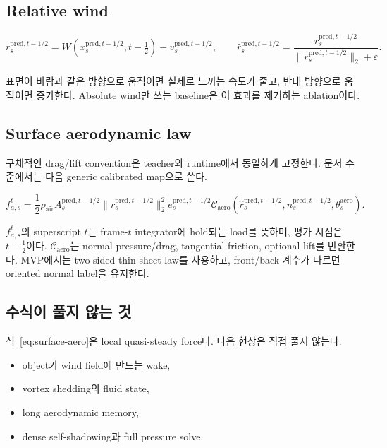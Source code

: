 \documentclass[11pt,a4paper]{article}
\newcommand{\eps}{\varepsilon}
\begin{document}
\subsection*{Relative wind}

\begin{equation}
  r_s^{\mathrm{pred},t-1/2}
  =
  W(x_s^{\mathrm{pred},t-1/2},t-\tfrac12)
  -v_s^{\mathrm{pred},t-1/2},
  \qquad
  \widehat r_s^{\mathrm{pred},t-1/2}
  =
  \frac{r_s^{\mathrm{pred},t-1/2}}
  {\|r_s^{\mathrm{pred},t-1/2}\|_2+\eps}.
  \label{eq:relative-wind}
\end{equation}

표면이 바람과 같은 방향으로 움직이면 실제로 느끼는 속도가 줄고,
반대 방향으로 움직이면 증가한다.
Absolute wind만 쓰는 baseline은 이 효과를 제거하는 ablation이다.

\subsection*{Surface aerodynamic law}

구체적인 drag/lift convention은 teacher와 runtime에서 동일하게 고정한다.
문서 수준에서는 다음 generic calibrated map으로 쓴다.

\begin{equation}
  f_{a,s}^t
  =
  \frac12\rho_{\mathrm{air}}
  A_s^{\mathrm{pred},t-1/2}
  \|r_s^{\mathrm{pred},t-1/2}\|_2^2
  e_s^{\mathrm{pred},t-1/2}
  \mathcal C_{\mathrm{aero}}
  \left(
    \widehat r_s^{\mathrm{pred},t-1/2},
    n_s^{\mathrm{pred},t-1/2},
    \theta_s^{\mathrm{aero}}
  \right).
  \label{eq:surface-aero}
\end{equation}

\(f_{a,s}^t\)의 superscript \(t\)는 frame-\(t\) integrator에 hold되는 load를 뜻하며,
평가 시점은 \(t-\tfrac12\)이다.
\(\mathcal C_{\mathrm{aero}}\)는 normal pressure/drag,
tangential friction, optional lift를 반환한다.
MVP에서는 two-sided thin-sheet law를 사용하고,
front/back 계수가 다르면 oriented normal label을 유지한다.

\subsection*{수식이 풀지 않는 것}

식~\eqref{eq:surface-aero}은 local quasi-steady force다.
다음 현상은 직접 풀지 않는다.

\begin{itemize}[leftmargin=1.5em]
  \item object가 wind field에 만드는 wake,
  \item vortex shedding의 fluid state,
  \item long aerodynamic memory,
  \item dense self-shadowing과 full pressure solve.
\end{itemize}
\end{document}

